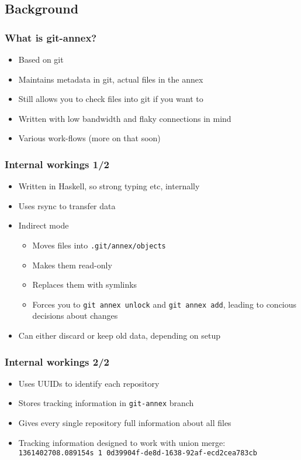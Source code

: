 \documentclass[t]{beamer}
\begin{document}
\subsection{Background}

\begin{frame}
	\frametitle{What is git-annex?}
	\begin{itemize}
		\item Based on git
		\item Maintains metadata in git, actual files in the annex
		\item Still allows you to check files into git if you want to
		\item Written with low bandwidth and flaky connections in mind
		\item Various work-flows (more on that soon)
	\end{itemize}
\end{frame}

\begin{frame}
	\frametitle{Internal workings 1/2}
	\begin{itemize}
		\item Written in Haskell, so strong typing etc, internally
		\item Uses rsync to transfer data
		\item Indirect mode
		\begin{itemize}
			\item Moves files into \texttt{.git/annex/objects}
			\item Makes them read-only
			\item Replaces them with symlinks
			\item Forces you to \texttt{git annex unlock} and \texttt{git annex add}, leading to concious decisions about changes
		\end{itemize}
		\item Can either discard or keep old data, depending on setup
	\end{itemize}
\end{frame}

\begin{frame}
	\frametitle{Internal workings 2/2}
	\begin{itemize}
		\item Uses UUIDs to identify each repository
		\item Stores tracking information in \texttt{git-annex} branch
		\item Gives every single repository full information about all files
		\item Tracking information designed to work with union merge: \\
			{\footnotesize \texttt{1361402708.089154s 1 0d39904f-de8d-1638-92af-ecd2cea783cb}}
	\end{itemize}
\end{frame}
\end{document}
